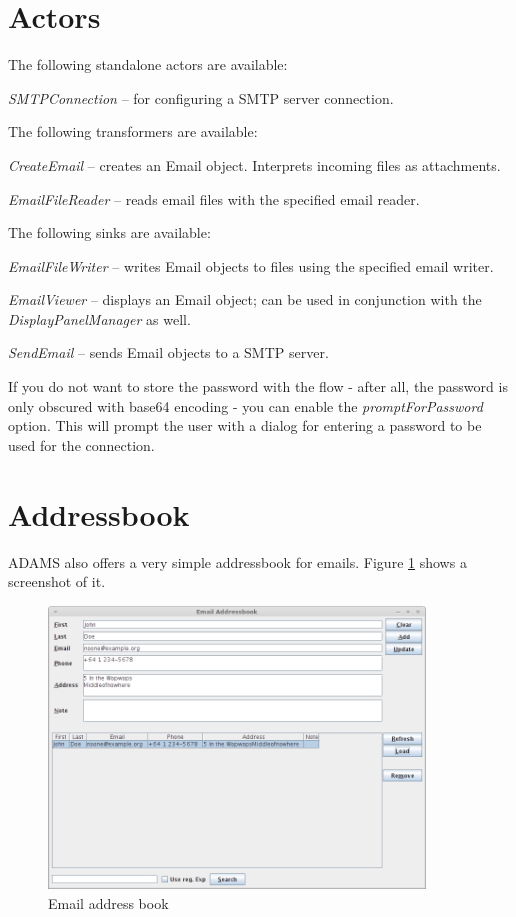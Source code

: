 \documentclass[a4paper]{book}
\begin{document}
\section{Actors}
The following standalone actors are available:
\begin{tight_itemize}
	\item \textit{SMTPConnection} -- for configuring a SMTP server connection.
\end{tight_itemize}
The following transformers are available:
\begin{tight_itemize}
	\item \textit{CreateEmail} -- creates an Email object. Interprets incoming files
	as attachments.
	\item \textit{EmailFileReader} -- reads email files with the specified email reader.
\end{tight_itemize}
The following sinks are available:
\begin{tight_itemize}
	\item \textit{EmailFileWriter} -- writes Email objects to files using the specified
	email writer.
	\item \textit{EmailViewer} -- displays an Email object; can be used in conjunction 
	with the \textit{DisplayPanelManager} as well.
	\item \textit{SendEmail} -- sends Email objects to a SMTP server.
\end{tight_itemize}

If you do not want to store the password with the flow - after all, the password
is only obscured with base64 encoding - you can enable the 
\textit{promptForPassword} option. This will prompt the user with a dialog 
for entering a password to be used for the connection.

\section{Addressbook}
ADAMS also offers a very simple addressbook for emails. Figure \ref{email_address_book}
shows a screenshot of it.
\begin{figure}[htb]
  \centering
  \includegraphics[width=10.0cm]{images/email_addressbook.png}
  \caption{Email address book}
  \label{email_address_book}
\end{figure}
\end{document}
